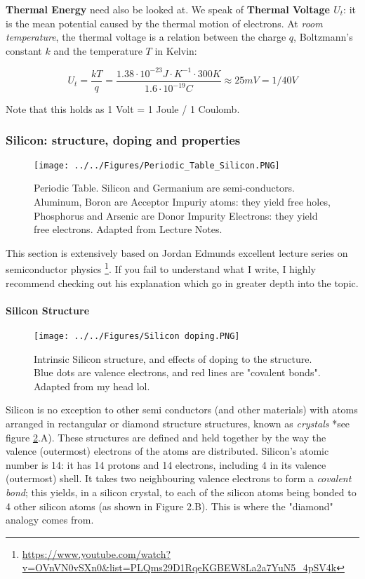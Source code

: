 \textbf{Thermal Energy} need also be looked at. We speak of \textbf{Thermal Voltage $U_t$}: it is the mean potential caused by the thermal motion of electrons. At \textit{room temperature}, the thermal voltage is a relation between the charge $q$, Boltzmann's constant $k$ and the temperature $T$ in Kelvin: 

\begin{equation}
     U_t = \frac{kT}{q} = \frac{1.38 \cdot 10^{-23} J\cdot K^{-1} \cdot 300 K}{1.6 \cdot 10^{-19}C} \approx 25 mV = 1/40 V
\end{equation}

Note that this holds as 1 Volt = 1 Joule / 1 Coulomb.

\subsubsection{Silicon: structure, doping and properties}

\begin{figure}[H]
    \centering
    \texttt{[image: ../../Figures/Periodic\_Table\_Silicon.PNG]}
    \caption{Periodic Table. Silicon and Germanium are semi-conductors. Aluminum, Boron are Acceptor Impuriy atoms: they yield free holes, Phosphorus and Arsenic are Donor Impurity Electrons: they yield free electrons. Adapted from Lecture Notes.}
    \label{fig:Periodic_Table_Conduction}
\end{figure}

This section is extensively based on Jordan Edmunds excellent lecture series on semiconductor physics \footnote{\url{https://www.youtube.com/watch?v=OVnVN0vSXn0&list=PLQms29D1RqeKGBEW8La2a7YuN5_4pSV4k}}. If you fail to understand what I write, I highly recommend checking out his explanation which go in greater depth into the topic. 

\paragraph{Silicon Structure}

\begin{figure}[H]
    \centering
    \texttt{[image: ../../Figures/Silicon doping.PNG]}
    \caption{Intrinsic Silicon structure, and effects of doping to the structure. Blue dots are valence electrons, and red lines are "covalent bonds". Adapted from my head lol.}
    \label{fig:Silicon_Doping}
\end{figure}

Silicon is no exception to other semi conductors (and other materials) with atoms arranged in rectangular or diamond structure structures, known as \textit{crystals} *see figure \ref{fig:Silicon_Doping}.A). These structures are defined and held together by the way the valence (outermost) electrons of the atoms are distributed. Silicon's atomic number is 14: it has 14 protons and 14 electrons, including 4 in its valence (outermost) shell. It takes two neighbouring valence electrons to form a \textit{covalent bond}; this yields, in a silicon crystal, to each of the silicon atoms being bonded to 4 other silicon atoms (as shown in Figure 2.B). This is where the "diamond" analogy comes from. 
 
